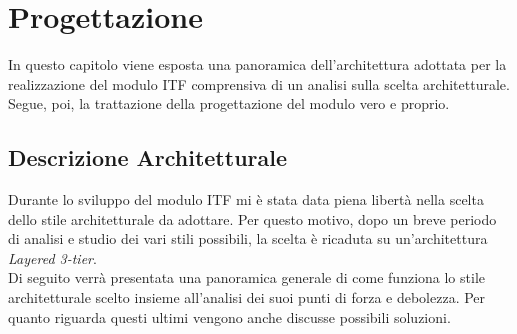 
\chapter{Progettazione}
\label{cap:progettazione}
In questo capitolo viene esposta una panoramica dell'architettura adottata per la realizzazione del modulo \gls{ITF} comprensiva di un analisi sulla scelta architetturale. Segue, poi, la trattazione della progettazione del modulo vero e proprio.\\
\section{Descrizione Architetturale}
Durante lo sviluppo del modulo \gls{ITF} mi è stata data piena libertà nella scelta dello stile architetturale da adottare. Per questo motivo, dopo un breve periodo di analisi e studio dei vari stili possibili, la scelta è ricaduta su un'architettura \textit{Layered 3-tier}.\\
Di seguito verrà presentata una panoramica generale di come funziona lo stile architetturale scelto insieme all'analisi dei suoi punti di forza e debolezza. Per quanto riguarda questi ultimi vengono anche discusse possibili soluzioni.\\
